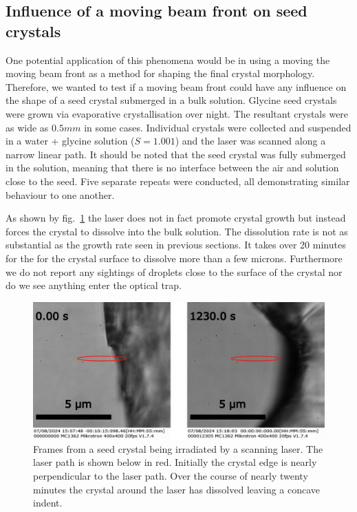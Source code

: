 \subsection{Influence of a moving beam front on seed crystals}
\label{sec:seed_crystals}
One potential application of this phenomena would be in using 
a moving the moving beam front as a method for shaping the 
final crystal morphology. Therefore, we wanted to test if a 
moving beam front could have any influence on the shape of a
seed crystal submerged in a bulk solution. Glycine seed crystals 
were grown via evaporative crystallisation over night. The 
resultant crystals were as wide as $0.5 mm$ in some cases. 
Individual crystals were collected and suspended in a water 
+ glycine solution ($S = 1.001$) and the laser was scanned 
along a narrow linear path. It should be noted that the seed 
crystal was fully submerged in the solution, meaning that there
is no interface between the air and solution close to the seed.
Five separate repeats were conducted, all demonstrating similar
behaviour to one another.  

As shown by fig.~\ref{fig:seed_crystals} the laser does not 
in fact promote crystal growth but instead forces the crystal 
to dissolve into the bulk solution. The dissolution rate is not 
as substantial as the growth rate seen in previous sections. 
It takes over 20 minutes for the for the crystal surface to 
dissolve more than a few microns. Furthermore we do not report 
any sightings of droplets close to the surface of the crystal 
nor do we see anything enter the optical trap.
\begin{figure}[h!]
	\centering
	\includegraphics[width=\linewidth]{seed_crystals.pdf}
	\caption{Frames from a seed crystal being irradiated by a 
		scanning laser. The laser path is shown below in red. 
		Initially the crystal edge is nearly perpendicular to 
		the laser path. Over the course of nearly twenty minutes 
		the crystal around the laser has dissolved leaving a 
		concave indent.}
	\label{fig:seed_crystals}
\end{figure}

